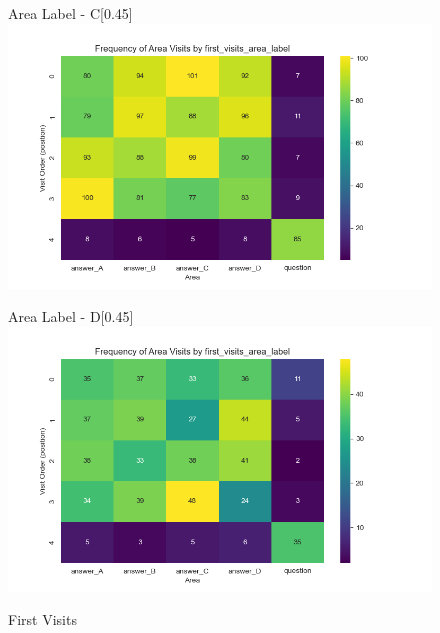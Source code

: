 \documentclass{article}
\begin{document}
\begin{figure}[H]
  \vspace{1em} %

  \begin{subcaptionbox}{Area Label - C\label{fig:al_c}}[0.45\textwidth]
    {\centering\includegraphics[width=\linewidth]{plots/visits/matrix_first_visits_first_visits_area_label_hunters_C (hunters).png}}
  \end{subcaptionbox}
  \hfill
  \begin{subcaptionbox}{Area Label - D\label{fig:al_d}}[0.45\textwidth]
    {\centering\includegraphics[width=\linewidth]{plots/visits/matrix_first_visits_first_visits_area_label_hunters_D (hunters).png}}
  \end{subcaptionbox}
  
  \caption{First Visits}
  \label{fig:fourimages1}
\end{figure}
\end{document}
